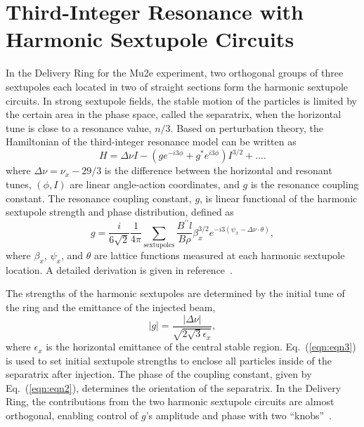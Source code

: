 \documentclass[aps,prstab,showpacs,onecolumn,12pt]{revtex4-1}
\begin{document}
\section{\label{sec:resonance}Third-Integer Resonance with Harmonic Sextupole Circuits}

In the Delivery Ring for the Mu2e experiment, two orthogonal groups of three sextupoles each located in two of straight sections form the harmonic sextupole circuits. In strong sextupole fields, the stable motion of the particles is limited by the certain area in the phase space, called the separatrix, when the horizontal tune is close to a resonance value, $n/3$.
Based on perturbation theory, the Hamiltonian of the third-integer resonance model can be written as
\begin{equation}
  H = \Delta \nu I - ( g e^{-i 3 \phi} + g^{*} e^{i 3 \phi} ) I^{3/2} + ... .
  \label{eqn:eqn1}
\end{equation}
where $\Delta \nu = \nu_{x} - 29/3$ is the difference between the horizontal and resonant tunes, $(\phi,I)$ are linear angle-action coordinates, and $g$ is the resonance coupling constant. The resonance coupling constant, $g$, is linear functional of the harmonic sextupole strength and phase distribution, defined as 
\begin{equation}
  g  = \frac{i}{6 \sqrt{2}} \frac{1}{4 \pi}
          \sum_{\text{sextupoles}} \frac{B^{\prime\prime} l}{B \rho}
          \beta^{3/2}_{x} e^{- i 3 \left( \psi_{x} 
                                           - \Delta \nu \cdot \theta \right) },
\label{eqn:eqn2}
\end{equation}
where $\beta_{x}$, $\psi_{x}$, and $\theta$ are lattice functions measured at each harmonic sextupole location. 
A detailed derivation is given in reference~\cite{Leo}. 

The strengths of the harmonic sextupoles are determined by the initial tune of the ring and the emittance of the injected beam,
\begin{equation}
  |g| = \frac{ | \Delta \nu | }{ \sqrt { 2 \sqrt{3} \epsilon_{x} } } ,
  \label{eqn:eqn3}
\end{equation}
where $\epsilon_{x}$ is the horizontal emittance of the central stable region. Eq.~(\ref{eqn:eqn3}) is used to set initial sextupole strengths to enclose all particles inside of the separatrix after injection. The phase of the coupling constant, given by Eq.~(\ref{eqn:eqn2}), determines the orientation of the separatrix. In the Delivery Ring, the contributions from the two harmonic sextupole circuits are almost orthogonal, enabling control of $g$'s amplitude and phase with two ``knobs''~\cite{Leo}.
\end{document}
